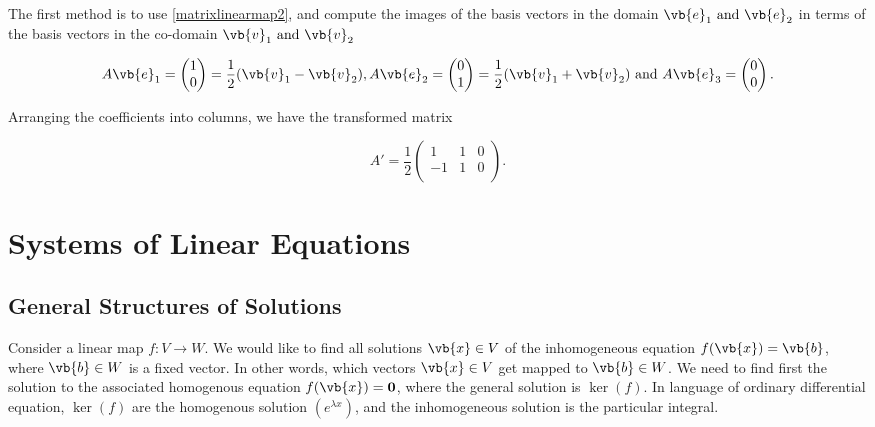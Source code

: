 \documentclass[a4paper,12pt]{report}
\begin{document}
{The first method is to use \cref{matrixlinearmap2}, and compute the images of the basis vectors in the domain \(\vb{e} _{1} \text { and } \vb{e} _{2} \) in terms of the basis vectors in the co-domain \(\vb{v} _{1} \text { and } \vb{v} _{2} \)

\begin{equation}
    A \vb{e} _{1} = \begin{pmatrix}
         1 \\
         0 \\
    \end{pmatrix} = \frac{1}{2}(\vb{v} _{1} - \vb{v} _{2}  ),  A\vb{e} _{2} = \begin{pmatrix}
         0 \\
         1 \\
    \end{pmatrix} = \frac{1}{2} (\vb{v} _{1}+ \vb{v} _{2}  ) \text { and } A\vb{e} _{3} = \begin{pmatrix}
         0 \\
         0 \\
    \end{pmatrix}.
\end{equation}

Arranging the coefficients into columns, we have the transformed matrix 

\begin{equation}
    A' = \frac{1}{2} \begin{pmatrix}
        1 &  1 & 0 \\
        -1 &  1 & 0 \\
    \end{pmatrix}.
\end{equation}
} 


\section{Systems of Linear Equations}

\subsection{General Structures of Solutions}

Consider a linear map \(f:V \to W\). We would like to find all solutions \(\vb{x} \in V\) of the inhomogeneous equation \(f(\vb{x} ) = \vb{b} \), where \(\vb{b} \in W\) is a fixed vector. In other words, which vectors \(\vb{x}  \in V\) get mapped to \(\vb{b} \in W\). We need to find first the solution to the associated homogenous equation \(f(\vb{x} ) = \boldsymbol{0} \), where the general solution is \(\ker (f)\). In language of ordinary differential equation, \(\ker (f)\) are the homogenous solution \((e^{\lambda x} )\), and the inhomogeneous solution is the particular integral.         
\end{document}

